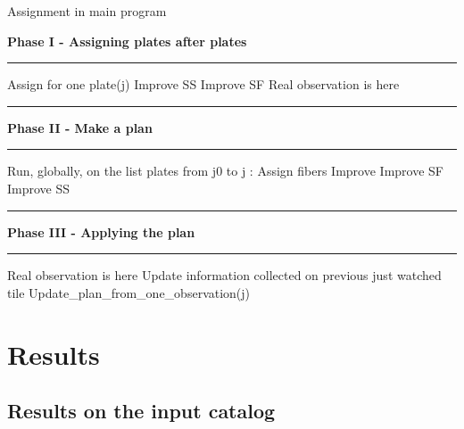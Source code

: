 \documentclass[10pt]{extarticle}
\newcommand\Algphasee[1]{%
\Statex\hspace*{-\algorithmicindent}\textbf{#1}%
\vspace*{-.7\baselineskip}\Statex\hspace*{\dimexpr-\algorithmicindent-2pt\relax}\rule{\linewidth}{0.4pt}%
}
\newcommand\Algphase[1]{%
\vspace*{-.7\baselineskip}\Statex\hspace*{\dimexpr-\algorithmicindent-2pt\relax}\rule{\linewidth}{0.4pt}%
\Statex\hspace*{-\algorithmicindent}\textbf{#1}%
\vspace*{-.7\baselineskip}\Statex\hspace*{\dimexpr-\algorithmicindent-2pt\relax}\rule{\linewidth}{0.4pt}%
}
\begin{document}
\begin{multicols}{2}
\begin{algorithm}[H]
	\caption{Assignment in main program}\label{euclid}
	\begin{algorithmic}[1]
		\Algphasee{Phase I - Assigning plates after plates}
		\State Assign for one plate(j)
		\State Improve SS
		\State Improve SF
		\State Real observation is here
		\EndFor
	\end{algorithmic}

	\begin{algorithmic}[1]
		\Algphase{Phase II - Make a plan}
		\State Run, globally, on the list plates from j0 to j :
		\State Assign fibers
		\State Improve
		\State Improve SF
		\State Improve SS
	\end{algorithmic}

	\begin{algorithmic}[1]
		\Algphase{Phase III - Applying the plan}
		\State Real observation is here
		\State Update information collected on previous just watched tile
		\State Update\_plan\_from\_one\_observation(j)
		\EndFor
	\end{algorithmic}
\end{algorithm}

\section{Results}
\subsection{Results on the input catalog}


\end{multicols}
\end{document}

